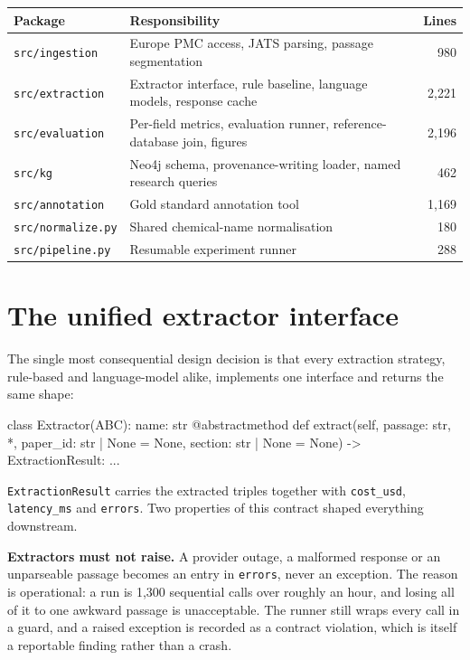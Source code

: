 \documentclass[11pt,a4paper,oneside]{report}
\begin{document}
\par\medskip
\begingroup
\small\setlength{\tabcolsep}{6pt}
\begin{tabularx}{\linewidth}{@{}lLr@{}}
\toprule
\textbf{Package} & \textbf{Responsibility} & \textbf{Lines} \\
\midrule
\texttt{src/\allowbreak{}ingestion} & Europe PMC access, JATS parsing, passage segmentation & 980 \\
\texttt{src/\allowbreak{}extraction} & Extractor interface, rule baseline, language models, response cache & 2,221 \\
\texttt{src/\allowbreak{}evaluation} & Per-field metrics, evaluation runner, reference-database join, figures & 2,196 \\
\texttt{src/\allowbreak{}kg} & Neo4j schema, provenance-writing loader, named research queries & 462 \\
\texttt{src/\allowbreak{}annotation} & Gold standard annotation tool & 1,169 \\
\texttt{src/\allowbreak{}normalize.\allowbreak{}py} & Shared chemical-name normalisation & 180 \\
\texttt{src/\allowbreak{}pipeline.\allowbreak{}py} & Resumable experiment runner & 288 \\
\bottomrule
\end{tabularx}
\endgroup
\par\medskip
\section{The unified extractor interface}

The single most consequential design decision is that every extraction strategy, rule-based and language-model alike, implements one interface and returns the same shape:

\begin{codeblock}
class Extractor(ABC):
    name: str
    @abstractmethod
    def extract(self, passage: str, *, paper_id: str | None = None,
                section: str | None = None) -> ExtractionResult: ...
\end{codeblock}

\texttt{ExtractionResult} carries the extracted triples together with \texttt{cost\_\allowbreak{}usd}, \texttt{latency\_\allowbreak{}ms} and \texttt{errors}. Two properties of this contract shaped everything downstream.

\textbf{Extractors must not raise.} A provider outage, a malformed response or an unparseable passage becomes an entry in \texttt{errors}, never an exception. The reason is operational: a run is 1,300 sequential calls over roughly an hour, and losing all of it to one awkward passage is unacceptable. The runner still wraps every call in a guard, and a raised exception is recorded as a contract violation, which is itself a reportable finding rather than a crash.
\end{document}

